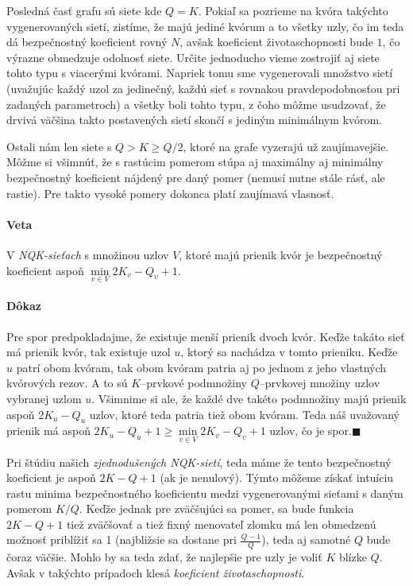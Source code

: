 Posledná časť grafu sú siete kde $Q=K$. Pokiaľ sa pozrieme na kvóra takýchto
vygenerovaných sietí, zistíme, že majú jediné kvórum a to všetky uzly, čo im
teda dá bezpečnostný koeficient rovný $N$, avšak koeficient životaschopnosti
bude $1$, čo výrazne obmedzuje odolnosť siete.
Určite jednoducho vieme zostrojiť aj siete tohto typu s viacerými kvórami.
Napriek tomu sme vygenerovali množstvo sietí (uvažujúc každý uzol za jedinečný,
každú sieť s rovnakou pravdepodobnosťou pri zadaných parametroch) a všetky boli
tohto typu, z čoho môžme usudzovať, že drvivá väčšina takto postavených sietí
skončí s jediným minimálnym kvórom.

Ostali nám len siete s $Q > K\geq Q/2$, ktoré na grafe vyzerajú už zaujímavejšie.
Môžme si všimnúť, že s rastúcim pomerom stúpa aj maximálny aj minimálny
bezpečnostný koeficient nájdený pre daný pomer (nemusí nutne stále rásť, ale
 rastie).
Pre takto vysoké pomery dokonca platí zaujímavá vlasnosť.

\paragraph{Veta}
V \textit{NQK-sieťach} s množinou uzlov $V$, ktoré majú prienik kvór je bezpečnostný
koeficient aspoň $\min\limits_{v\in V}2K_v-Q_v+1$.

\paragraph{Dôkaz}
Pre spor predpokladajme, že existuje menší prienik dvoch kvór.
Keďže takáto sieť má prienik kvór, tak existuje uzol $u$, ktorý sa nachádza v tomto
prieniku. Keďže $u$ patrí obom kvóram, tak obom kvóram patria aj po jednom z jeho
vlastných kvórových rezov. A to sú $K$--prvkové podmnožiny $Q$--prvkovej množiny uzlov
vybranej uzlom $u$. Všimnime si ale, že každé dve takéto podmnožiny majú prienik aspoň
$2K_u-Q_u$ uzlov, ktoré teda patria tiež obom kvóram. Teda náš uvažovaný prienik má
aspoň $2K_u-Q_u+1\geq\min\limits_{v\in V}2K_v-Q_v+1$ uzlov, čo je spor.$\blacksquare$

\vspace{3mm}
Pri štúdiu našich \textit{zjednodušených NQK-sietí}, teda máme že tento bezpečnostný
koeficient je aspoň $2K-Q+1$ (ak je nenulový). Týmto môžeme získať intuíciu rastu
minima bezpečnostného koeficientu medzi vygenerovanými sieťami s daným pomerom $K/Q$.
Keďže jednak pre zväčšujúci sa pomer, sa bude funkcia $2K-Q+1$ tiež zväčšovať a tiež
fixný menovateľ zlomku má len obmedzenú možnosť priblížiť sa 1 (najbližsie sa dostane pri
$\frac{Q-1}{Q}$), teda aj samotné $Q$ bude čoraz väčšie. Mohlo by sa teda zdať, že
najlepšie pre uzly je voliť $K$ blízke $Q$. Avšak v takýchto prípadoch klesá
\textit{koeficient životaschopnosti}.

